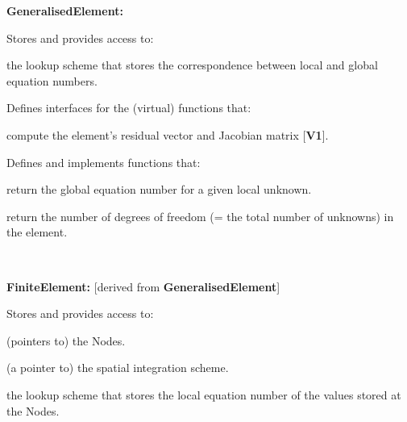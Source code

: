 \begin{center}\begin{TabularC}{1}
\hline
\begin{center} \begin{TabularC}{1}
\hline
\begin{center} {\bfseries Generalised\-Element\-:} \end{center} 
\begin{DoxyItemize}
\item Stores and provides access to\-:
\begin{DoxyItemize}
\item the lookup scheme that stores the correspondence between local and global equation numbers.
\end{DoxyItemize}
\item Defines interfaces for the (virtual) functions that\-:
\begin{DoxyItemize}
\item compute the element's residual vector and Jacobian matrix \mbox{[}{\bfseries V1}\mbox{]}.
\end{DoxyItemize}
\item Defines and implements functions that\-:
\begin{DoxyItemize}
\item return the global equation number for a given local unknown.
\item return the number of degrees of freedom (= the total number of unknowns) in the element.   
\end{DoxyItemize}
\end{DoxyItemize}\\
\end{TabularC}
\end{center}  \begin{center} \begin{TabularC}{1}
\hline
\begin{center} {\bfseries Finite\-Element\-:} \newline
\mbox{[}derived from {\bfseries Generalised\-Element}\mbox{]} \end{center} 
\begin{DoxyItemize}
\item Stores and provides access to\-:
\begin{DoxyItemize}
\item (pointers to) the {\ttfamily Nodes}.
\item (a pointer to) the spatial integration scheme.
\item the lookup scheme that stores the local equation number of the values stored at the {\ttfamily Nodes}.

\end{DoxyItemize}
\end{DoxyItemize}
\end{TabularC}
\end{center}
\end{TabularC}
\end{center}
